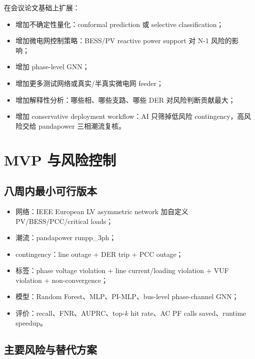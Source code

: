 \documentclass[UTF8,11pt]{ctexart}
\begin{document}
在会议论文基础上扩展：

\begin{itemize}
    \item 增加不确定性量化：conformal prediction 或 selective classification；
    \item 增加微电网控制策略：BESS/PV reactive power support 对 N-1 风险的影响；
    \item 增加 phase-level GNN；
    \item 增加更多测试网络或真实/半真实微电网 feeder；
    \item 增加解释性分析：哪些相、哪些支路、哪些 DER 对风险判断贡献最大；
    \item 增加 conservative deployment workflow：AI 只筛掉低风险 contingency，高风险交给 pandapower 三相潮流复核。
\end{itemize}

\section{MVP 与风险控制}

\subsection{八周内最小可行版本}

\begin{itemize}
    \item 网络：IEEE European LV asymmetric network 加自定义 PV/BESS/PCC/critical loads；
    \item 潮流：pandapower runpp\_3ph；
    \item contingency：line outage + DER trip + PCC outage；
    \item 标签：phase voltage violation + line current/loading violation + VUF violation + non-convergence；
    \item 模型：Random Forest、MLP、PI-MLP、bus-level phase-channel GNN；
    \item 评价：recall、FNR、AUPRC、top-$k$ hit rate、AC PF calls saved、runtime speedup。
\end{itemize}

\subsection{主要风险与替代方案}
\end{document}
